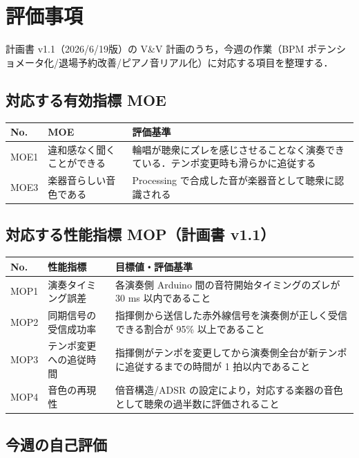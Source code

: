 \documentclass[a4paper,11pt]{ltjsarticle}
\providecommand{\％}{\%}
\begin{document}
\section{評価事項}\label{sec:evaluation}

計画書 v1.1（2026/6/19版）の V\&V 計画のうち，今週の作業（BPM ポテンショメータ化/退場予約改善/ピアノ音リアル化）に対応する項目を整理する．

\subsection{対応する有効指標 MOE}\label{sec:moe}

\begin{longtable}{|p{1.2cm}|p{4cm}|p{8cm}|}
\hline
\rowcolor[gray]{0.9}
No. & MOE & 評価基準 \\
\hline
MOE1 & 違和感なく聞くことができる & 輪唱が聴衆にズレを感じさせることなく演奏できている．テンポ変更時も滑らかに追従する \\
\hline
MOE3 & 楽器音らしい音色である & Processing で合成した音が楽器音として聴衆に認識される \\
\hline
\end{longtable}

\subsection{対応する性能指標 MOP（計画書 v1.1）}\label{sec:mop}

\begin{longtable}{|p{1.2cm}|p{3.8cm}|p{8.8cm}|}
\hline
\rowcolor[gray]{0.9}
No. & 性能指標 & 目標値・評価基準 \\
\hline
MOP1 & 演奏タイミング誤差 & 各演奏側 Arduino 間の音符開始タイミングのズレが 30 ms 以内であること \\
\hline
MOP2 & 同期信号の受信成功率 & 指揮側から送信した赤外線信号を演奏側が正しく受信できる割合が 95\% 以上であること \\
\hline
MOP3 & テンポ変更への追従時間 & 指揮側がテンポを変更してから演奏側全台が新テンポに追従するまでの時間が 1 拍以内であること \\
\hline
MOP4 & 音色の再現性 & 倍音構造/ADSR の設定により，対応する楽器の音色として聴衆の過半数に評価されること \\
\hline
\end{longtable}

\subsection{今週の自己評価}\label{sec:selfeval}
\end{document}

